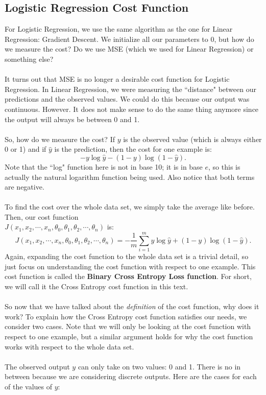 \documentclass{article}
\begin{document}
\subsection{Logistic Regression Cost Function}
For Logistic Regression, we use the same algorithm as the one for Linear Regression: Gradient Descent. We initialize all our parameters to 0, but how do we measure the cost? Do we use MSE (which we used for Linear Regression) or something else?
\\
\\
It turns out that MSE is no longer a desirable cost function for Logistic Regression. In Linear Regression, we were measuring the ``distance" between our predictions and the observed values. We could do this because our output was continuous. However. It does not make sense to do the same thing anymore since the output will always be between 0 and 1. 
\\
\\
So, how do we measure the cost? If $y$ is the observed value (which is always either 0 or 1) and if $\hat{y}$ is the prediction, then the cost for one example is:
\[-y\log{\hat{y}}-(1-y)\log{(1-\hat{y})}.\]
Note that the ``log" function here is not in base 10; it is in base $e$, so this is actually the natural logarithm function being used. Also notice that both terms are negative.
\\
\\
To find the cost over the whole data set, we simply take the average like before. Then, our cost function
\\
$J(x_1,x_2,\cdots,x_n,\theta_0,\theta_1,\theta_2,\cdots,\theta_n)$ is:
\[J(x_1,x_2,\cdots,x_n,\theta_0,\theta_1,\theta_2,\cdots,\theta_n)=-\frac{1}{m}\sum_{i=1}^m y\log{\hat{y}}+(1-y)\log{(1-\hat{y})}.\]
Again, expanding the cost function to the whole data set is a trivial detail, so just focus on understanding the cost function with respect to one example. This cost function is called the \textbf{Binary Cross Entropy Loss function}. For short, we will call it the Cross Entropy cost function in this text. 
\\
\\
So now that we have talked about the \textit{definition} of the cost function, why does it work? To explain how the Cross Entropy cost function satisfies our needs, we consider two cases. Note that we will only be looking at the cost function with respect to one example, but a similar argument holds for why the cost function works with respect to the whole data set. 
\\
\\
The observed output $y$ can only take on two values: 0 and 1. There is no in between because we are considering discrete outputs. Here are the cases for each of the values of $y$:
\end{document}
